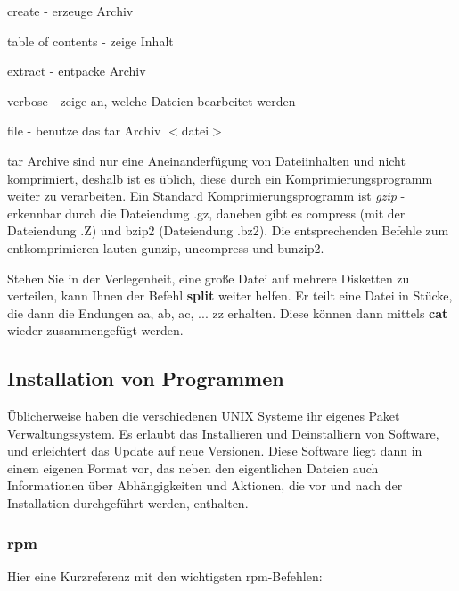 \documentclass[titlepage,a4paper]{article}
\begin{document}
\begin{description}
\setlength{\itemsep}{0pt}
\item[c] create - erzeuge Archiv
\item[t] table of contents - zeige Inhalt
\item[x] extract - entpacke Archiv
\item[v] verbose - zeige an, welche Dateien bearbeitet werden
\item[f $<$datei$>$] file - benutze das tar Archiv $<$datei$>$
\end{description}

tar Archive sind nur eine Aneinanderfügung von Dateiinhalten und nicht
komprimiert, deshalb ist es üblich, diese durch ein Komprimierungsprogramm
weiter zu verarbeiten.  Ein Standard Komprimierungsprogramm ist \emph{gzip} -
erkennbar durch die Dateiendung .gz, daneben gibt es compress (mit der
Dateiendung .Z) und bzip2 (Dateiendung .bz2).  Die entsprechenden Befehle zum
entkomprimieren lauten gunzip, uncompress und bunzip2.

Stehen Sie in der Verlegenheit, eine große Datei auf mehrere Disketten zu
verteilen, kann Ihnen der Befehl \textbf{split} weiter helfen.  Er teilt eine
Datei in Stücke, die dann die Endungen aa, ab, ac, ... zz erhalten.  Diese
können dann mittels \textbf{cat} wieder zusammengefügt werden.

\subsection{Installation von Programmen}
\label{sec:install}

Üblicherweise haben die verschiedenen UNIX Systeme ihr eigenes Paket
Verwal\-tungs\-system.  Es erlaubt das Installieren und Deinstalliern von
Software, und erleichtert das Update auf neue Versionen.  Diese Software liegt
dann in einem eigenen Format vor, das neben den eigentlichen Dateien auch
Informationen über Abhängigkeiten und Aktionen, die vor und nach der
Installation durchgeführt werden, enthalten.

\subsubsection*{rpm}
\label{sec:rpm}

Hier eine Kurzreferenz mit den wichtigsten rpm-Befehlen:
\end{document}
